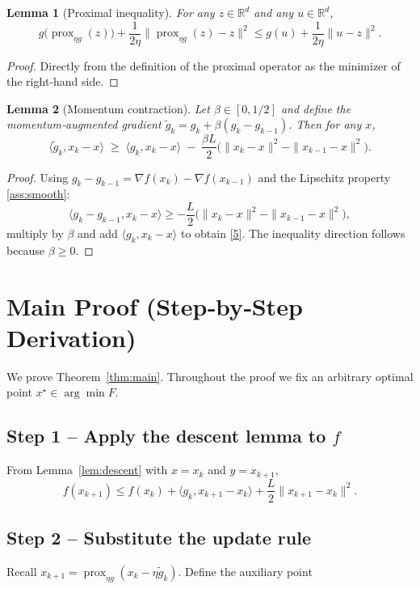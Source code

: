 \documentclass[11pt]{article}
\newtheorem{lemma}{Lemma}[section]
\begin{document}
\begin{lemma}[Proximal inequality]\label{lem:prox}
For any $z\in\mathbb{R}^{d}$ and any $u\in\mathbb{R}^{d}$,
\[
g\bigl(\operatorname{prox}_{\eta g}(z)\bigr)
+\frac{1}{2\eta}\bigl\|\operatorname{prox}_{\eta g}(z)-z\bigr\|^{2}
\le
g(u)+\frac{1}{2\eta}\|u-z\|^{2}.
\tag{4}
\]
\end{lemma}
\begin{proof}
Directly from the definition of the proximal operator as the minimizer of the right‑hand side.
\end{proof}

\begin{lemma}[Momentum contraction]\label{lem:momentum}
Let $\beta\in[0,1/2]$ and define the momentum‑augmented gradient $\tilde g_{k}=g_{k}+\beta(g_{k}-g_{k-1})$.  
Then for any $x$,
\[
\langle\tilde g_{k},x_{k}-x\rangle
\;\ge\;
\langle g_{k},x_{k}-x\rangle
\;-\;
\frac{\beta L}{2}\bigl(\|x_{k}-x\|^{2}-\|x_{k-1}-x\|^{2}\bigr).
\tag{5}
\]
\end{lemma}
\begin{proof}
Using $g_{k}-g_{k-1}=\nabla f(x_{k})-\nabla f(x_{k-1})$ and the Lipschitz property \ref{ass:smooth}:
\[
\langle g_{k}-g_{k-1},x_{k}-x\rangle
\ge
-\frac{L}{2}\bigl(\|x_{k}-x\|^{2}-\|x_{k-1}-x\|^{2}\bigr),
\]
multiply by $\beta$ and add $\langle g_{k},x_{k}-x\rangle$ to obtain \eqref{5}.  The inequality direction follows because $\beta\ge0$.
\end{proof}

\section*{Main Proof (Step‑by‑Step Derivation)}
We prove Theorem~\ref{thm:main}.  Throughout the proof we fix an arbitrary optimal point $x^{\star}\in\arg\min F$.

\subsection*{Step 1 – Apply the descent lemma to $f$}
From Lemma~\ref{lem:descent} with $x=x_{k}$ and $y=x_{k+1}$,
\[
f(x_{k+1})\le f(x_{k})+\langle g_{k},x_{k+1}-x_{k}\rangle+\frac{L}{2}\|x_{k+1}-x_{k}\|^{2}.
\tag{6}
\]

\subsection*{Step 2 – Substitute the update rule}
Recall $x_{k+1}= \operatorname{prox}_{\eta g}(x_{k}-\eta\tilde g_{k})$.  Define the auxiliary point  
\end{document}
